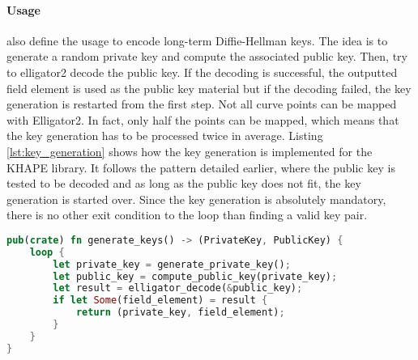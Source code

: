 ﻿\documentclass[../report.tex]{subfiles}
\begin{document}
\paragraph{Usage}
\cite{Elligator2_Paper} also define the usage to encode long-term Diffie-Hellman keys. 
The idea is to generate a random private key and compute the associated public key. Then, try to elligator2 decode the public key. 
If the decoding is successful, the outputted field element is used as the public key material but if the decoding failed, the key generation is restarted from the first step.
Not all curve points can be mapped with Elligator2. 
In fact, only half the points can be mapped, which means that the key generation has to be processed twice in average.
Listing \ref{lst:key_generation} shows how the key generation is implemented for the KHAPE library. It follows the pattern detailed earlier, where the public key is tested to be decoded and as long as the public key does not fit, the key generation is started over. Since the key generation is absolutely mandatory, there is no other exit condition to the loop than finding a valid key pair.

\begin{lstlisting}[language=Rust, caption=Key generation function, label={lst:key_generation}]
pub(crate) fn generate_keys() -> (PrivateKey, PublicKey) {
    loop {
        let private_key = generate_private_key();
        let public_key = compute_public_key(private_key);
        let result = elligator_decode(&public_key);
        if let Some(field_element) = result {
            return (private_key, field_element);
        }
    }
}
\end{lstlisting}
\end{document}
